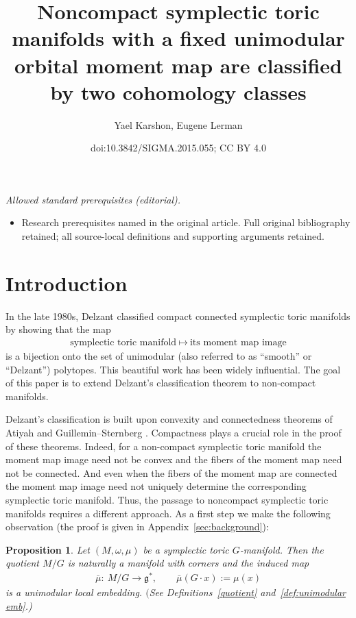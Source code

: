 \documentclass[10pt,a4paper]{amsart}
\title{Noncompact symplectic toric manifolds with a fixed unimodular orbital moment map are classified by two cohomology classes}
\author{Yael Karshon, Eugene Lerman}
\date{doi:10.3842/SIGMA.2015.055; CC BY 4.0}
\numberwithin{equation}{section}
\newtheorem{Proposition}[Lemma]{Proposition}
\begin{document}
\maketitle
\noindent\textit{Allowed standard prerequisites (editorial).}\begin{itemize}
\item Research prerequisites named in the original article. Full original bibliography retained; all source-local definitions and supporting arguments retained.
\end{itemize}\medskip
\section{Introduction}


In the late 1980s, Delzant classif\/ied compact connected symplectic
toric manifolds \cite{De} by showing that the map
\begin{gather*}
\text{symplectic toric manifold} \ \mapsto \ \text{its moment map image}
\end{gather*}
is a bijection onto the set of unimodular (also referred to
as ``smooth'' or ``Delzant'') polytopes.
This beautiful work has been widely inf\/luential.
The goal of this paper is to extend Delzant's classif\/ication
theorem to non-compact manifolds.

Delzant's classif\/ication is built upon convexity and connectedness
theorems of Atiyah and Guillemin--Sternberg \cite{At,GS:convexity}.
Compactness plays a crucial role in the proof of these theorems.
Indeed, for a non-compact symplectic toric manifold the moment map
image need not be convex and the f\/ibers of the moment map need not be
connected. And even when the f\/ibers of the moment map are connected
the moment map image need not uniquely determine the corresponding
symplectic toric manifold.  Thus, the passage to noncompact symplectic
toric manifolds requires a dif\/ferent approach.  As a f\/irst step we
make the following observation (the proof is given in
Appendix~\ref{sec:background}):

\begin{Proposition} \label{prop:unimod-emb 1}
  Let $(M,\omega, \mu)$ be a symplectic toric $G$-manifold.
  Then the quotient $M/G$ is naturally a manifold with corners
  and the induced map
\begin{gather*} %
  \bar{\mu} \colon \ M/G\to {\mathfrak g}^*, \qquad \bar{\mu}(G\cdot x) := \mu(x)
\end{gather*}
is a unimodular local embedding.
$($See Definitions~{\rm \ref{quotient}} and~{\rm \ref{def:unimodular emb}.)}
\end{Proposition}
\end{document}

